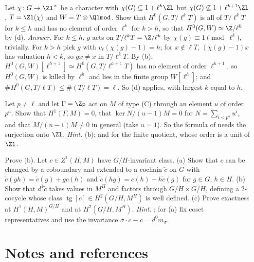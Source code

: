 \begin{exercise}\label{ex:cohomology:h0-length}
Let $\chi\colon G\to\Zl^\times$ be a character with $\chi(G)\subseteq1+\ell^h\Zl$ but $\chi(G)\not\subseteq1+\ell^{h+1}\Zl$, $T=\Zl(\chi)$ and $W=T\otimes\Qlmod$. Show that $H^0(G,T/\ell^kT)$ is all
of $T/\ell^kT$ for $k\le h$ and has no element of order $\ell^k$ for $k>h$, so that $H^0(G,W)\simeq\Z/\ell^h$ by (d).
\emph{Answer.} For $k\le h$, $g$ acts on $T/\ell^kT=\Z/\ell^k$ by $\chi(g)\equiv1\pmod{\ell^k}$, trivially. For $k>h$ pick $g$ with $v_\ell(\chi(g)-1)=h$; for $x\notin\ell T$,
$(\chi(g)-1)x$ has valuation $h<k$, so $gx\ne x$ in $T/\ell^kT$. By (b), $H^0(G,W)[\ell^{h+1}]\simeq H^0(G,T/\ell^{h+1}T)$ has no element of
order $\ell^{h+1}$, so $H^0(G,W)$ is killed by $\ell^h$ and lies in the finite group $W[\ell^h]$; and $\#H^0(G,T/\ell T)\le\#(T/\ell T)=\ell$. So (d) applies, with largest $k$
equal to $h$.
\end{exercise}

\begin{exercise}\label{ex:cohomology:zp-not-zl}
Let $p\ne\ell$ and let $\Gamma=\Zp$ act on $M$ of type (C) through an element $u$ of order $p^a$. Show that $H^1(\Gamma,M)=0$, that $\ker N/(u-1)M=0$ for $N=\sum_{i<p^a}u^i$, and that
$M/(u-1)M\ne0$ in general (take $u=1$). So the formula of  needs the surjection onto $\Zl$.
\emph{Hint.} (b); and  for the finite quotient, whose order is a unit of $\Zl$.
\end{exercise}

\begin{exercise}[harder]\label{ex:cohomology:transgression}
Prove (b). Let $c\in Z^1(H,M)$ have $G/H$-invariant class. (a) Show that $c$ can be changed by a coboundary and extended to a cochain $\tilde c$
on $G$ with $\tilde c(gh)=\tilde c(g)+gc(h)$ and $\tilde c(hg)=c(h)+h\tilde c(g)$ for $g\in G$, $h\in H$. (b) Show that $d^1\tilde c$ takes values in $M^H$ and factors through
$G/H\times G/H$, defining a $2$-cocycle whose class $\operatorname{tg}[c]\in H^2(G/H,M^H)$ is well defined. (c) Prove exactness at $H^1(H,M)^{G/H}$ and at $H^2(G/H,M^H)$.
\emph{Hint.} \cite[Chapter I, Section 6]{NSW}; for (a) fix coset representatives and use the invariance $\sigma\cdot c-c=d^0m_\sigma$.
\end{exercise}

\section{Notes and references}\label{sec:cohomology:notes}

